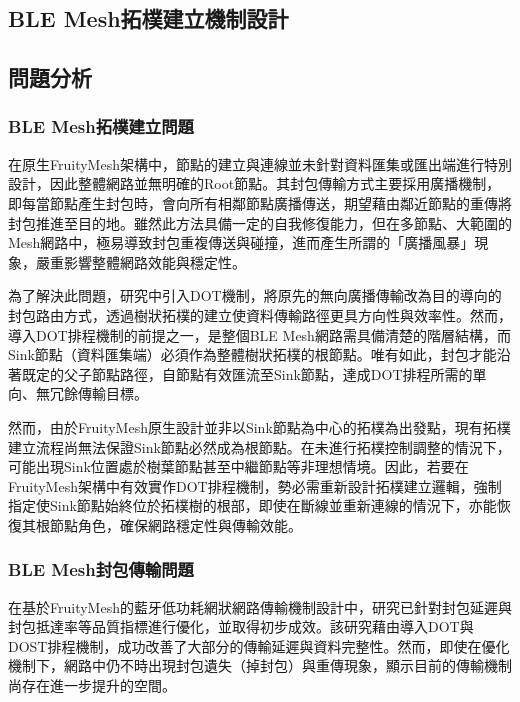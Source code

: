 \begin{ZhChapter}

\chapter{BLE Mesh拓樸建立機制設計}

\section{問題分析}

\subsection{BLE Mesh拓樸建立問題}

在原生FruityMesh架構中，節點的建立與連線並未針對資料匯集或匯出端進行特別設計，因此整體網路並無明確的Root節點。其封包傳輸方式主要採用廣播機制，即每當節點產生封包時，會向所有相鄰節點廣播傳送，期望藉由鄰近節點的重傳將封包推進至目的地。雖然此方法具備一定的自我修復能力，但在多節點、大範圍的Mesh網路中，極易導致封包重複傳送與碰撞，進而產生所謂的「廣播風暴」現象，嚴重影響整體網路效能與穩定性。

為了解決此問題，研究中引入DOT機制\cite{112TIT00392032}，將原先的無向廣播傳輸改為目的導向的封包路由方式，透過樹狀拓樸的建立使資料傳輸路徑更具方向性與效率性。然而，導入DOT排程機制的前提之一，是整個BLE Mesh網路需具備清楚的階層結構，而Sink節點（資料匯集端）必須作為整體樹狀拓樸的根節點。唯有如此，封包才能沿著既定的父子節點路徑，自節點有效匯流至Sink節點，達成DOT排程所需的單向、無冗餘傳輸目標。

然而，由於FruityMesh原生設計並非以Sink節點為中心的拓樸為出發點，現有拓樸建立流程尚無法保證Sink節點必然成為根節點。在未進行拓樸控制調整的情況下，可能出現Sink位置處於樹葉節點甚至中繼節點等非理想情境。因此，若要在FruityMesh架構中有效實作DOT排程機制，勢必需重新設計拓樸建立邏輯，強制指定使Sink節點始終位於拓樸樹的根部，即使在斷線並重新連線的情況下，亦能恢復其根節點角色，確保網路穩定性與傳輸效能。

\subsection{BLE Mesh封包傳輸問題}

在基於FruityMesh的藍牙低功耗網狀網路傳輸機制設計中，\cite{112TIT00392032}研究已針對封包延遲與封包抵達率等品質指標進行優化，並取得初步成效。該研究藉由導入DOT與DOST排程機制，成功改善了大部分的傳輸延遲與資料完整性。然而，即使在優化機制下，網路中仍不時出現封包遺失（掉封包）與重傳現象，顯示目前的傳輸機制尚存在進一步提升的空間。


\end{ZhChapter}
